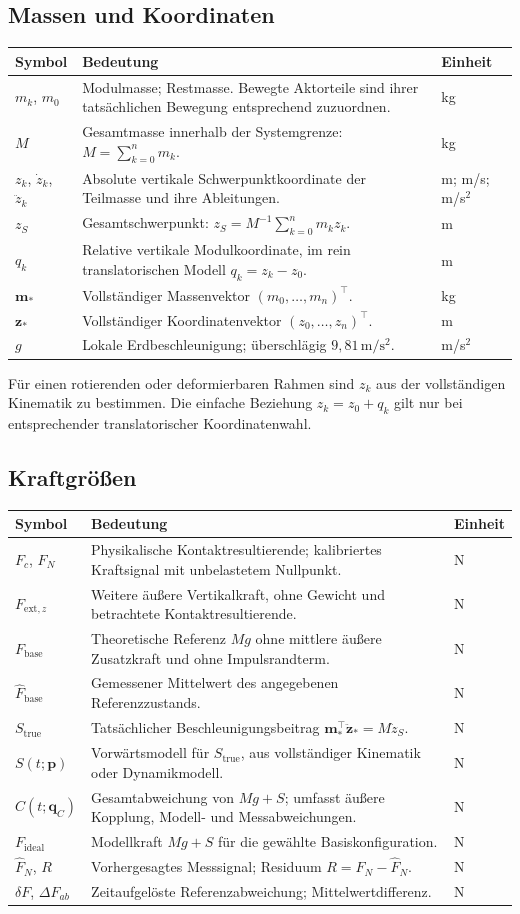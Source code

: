 \documentclass[11pt,a4paper]{article}
\makeatletter
\newenvironment{symtab}{\begin{longtable}{@{}L{.22\textwidth}L{.62\textwidth}L{.12\textwidth}@{}}\toprule\textbf{Symbol}&\textbf{Bedeutung}&\textbf{Einheit}\\\midrule\endhead}{\bottomrule\end{longtable}}
\makeatother
\begin{document}
\subsection{Massen und Koordinaten}
\begin{symtab}
$m_k$, $m_0$&Modulmasse; Restmasse. Bewegte Aktorteile sind ihrer tatsächlichen Bewegung entsprechend zuzuordnen.&kg\\
$M$&Gesamtmasse innerhalb der Systemgrenze: $M=\sum_{k=0}^n m_k$.&kg\\
$z_k$, $\dot z_k$, $\ddot z_k$&Absolute vertikale Schwerpunktkoordinate der Teilmasse und ihre Ableitungen.&m; m/s; m/s$^2$\\
$z_S$&Gesamtschwerpunkt: $z_S=M^{-1}\sum_{k=0}^n m_kz_k$.&m\\
$q_k$&Relative vertikale Modulkoordinate, im rein translatorischen Modell $q_k=z_k-z_0$.&m\\
$\mathbf m_*$&Vollständiger Massenvektor $(m_0,\ldots,m_n)^\top$.&kg\\
$\mathbf z_*$&Vollständiger Koordinatenvektor $(z_0,\ldots,z_n)^\top$.&m\\
$g$&Lokale Erdbeschleunigung; überschlägig $9{,}81\,\mathrm{m/s^2}$.&m/s$^2$\\
\end{symtab}
Für einen rotierenden oder deformierbaren Rahmen sind $z_k$ aus der vollständigen Kinematik zu bestimmen. Die einfache Beziehung $z_k=z_0+q_k$ gilt nur bei entsprechender translatorischer Koordinatenwahl.

\subsection{Kraftgrößen}
\begin{symtab}
$F_c$, $F_N$&Physikalische Kontaktresultierende; kalibriertes Kraftsignal mit unbelastetem Nullpunkt.&N\\
$F_{\mathrm{ext},z}$&Weitere äußere Vertikalkraft, ohne Gewicht und betrachtete Kontaktresultierende.&N\\
$F_{\mathrm{base}}$&Theoretische Referenz $Mg$ ohne mittlere äußere Zusatzkraft und ohne Impulsrandterm.&N\\
$\hat F_{\mathrm{base}}$&Gemessener Mittelwert des angegebenen Referenzzustands.&N\\
$S_{\mathrm{true}}$&Tatsächlicher Beschleunigungsbeitrag $\mathbf m_*^\top\ddot{\mathbf z}_*=M\ddot z_S$.&N\\
$S(t;\mathbf p)$&Vorwärtsmodell für $S_{\mathrm{true}}$, aus vollständiger Kinematik oder Dynamikmodell.&N\\
$C(t;\mathbf q_C)$&Gesamtabweichung von $Mg+S$; umfasst äußere Kopplung, Modell- und Messabweichungen.&N\\
$F_{\mathrm{ideal}}$&Modellkraft $Mg+S$ für die gewählte Basiskonfiguration.&N\\
$\hat F_N$, $R$&Vorhergesagtes Messsignal; Residuum $R=F_N-\hat F_N$.&N\\
$\delta F$, $\Delta F_{ab}$&Zeitaufgelöste Referenzabweichung; Mittelwertdifferenz.&N\\
\end{symtab}
\end{document}
